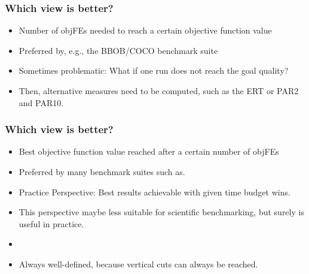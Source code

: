 \documentclass[aspectratio=169,mathserif,notheorems]{beamer}%
\begin{document}
\begin{frame}[t]%
\frametitle{Which view is better?}%
\begin{itemize}%
\item \alert{Number of \glspl{objFE} needed to reach a certain objective function value}%
\item Preferred by, e.g., the BBOB/COCO benchmark suite\cite{HAFR2010RPBBOB2ES}%
%
\item<5-> Sometimes problematic: What if one run does not reach the goal quality?%
\item<6-> Then, alternative measures need to be computed, such as the ERT\cite{P1997DEVTFOT2I,AH2005PEOAALSEA} or PAR2 and PAR10\cite{BKKLMFHHLBTV2016AABLFAS,KBT2018POSOTAPIARSBOITS}.%
\end{itemize}%
%
%
%
\end{frame}%
%
\begin{frame}%
\frametitle{Which view is better?}%
\begin{itemize}%
\item \alert{Best objective function value reached after a certain number of \glspl{objFE}}%
\item<2-> Preferred by many benchmark suites such as\cite{TLSYW2010BFFTC2SSACOLSGO}.%
\item<3-> Practice Perspective: Best results achievable with given time budget wins.%
\item<4-> This perspective maybe less suitable for scientific benchmarking, but surely is useful in practice.%
\item<5-> 
\item<6-> Always well-defined, because vertical cuts can always be reached.%
\end{itemize}%
\end{frame}%
\end{document}

